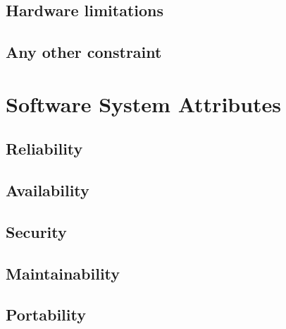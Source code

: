 \subsection{Hardware limitations}
\subsection{Any other constraint}

\section{Software System Attributes}
\label{sec:sys_attribs}

\subsection{Reliability}
\subsection{Availability}
\subsection{Security}
\subsection{Maintainability}
\subsection{Portability}

